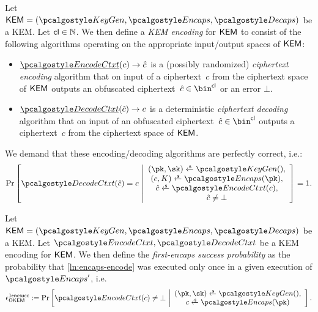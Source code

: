 \begin{definition}
\label{def:kem-encoding}
    Let $\KEM = (\kgen, \encaps, \decaps)$ be a KEM.
    Let $\mathsf{cl} \in \mathbb N$.
    We then define a \emph{KEM encoding} for $\mathsf{KEM}$ to consist of the following algorithms operating on the appropriate input/output spaces of $\mathsf{KEM}$:
    \begin{itemize}
        \item $\ul{\encodectxt}(c) \to \hat c$
        is a (possibly randomized) \emph{ciphertext encoding} algorithm that on input of a ciphertext~$c$ from the ciphertext space of $\mathsf{KEM}$ outputs an obfuscated ciphertext~$\hat c \in \bin^{\obfctxtlen}$ or an error $\bot$.
        \item $\ul{\decodectxt}(\hat c) \to c$
        is a deterministic \emph{ciphertext decoding} algorithm that on input of an obfuscated ciphertext~$\hat c \in \bin^{\obfctxtlen}$ outputs a ciphertext~$c$ from the ciphertext space of $\mathsf{KEM}$.
    \end{itemize}

    We demand that these encoding/decoding algorithms are perfectly correct, i.e.:
    \[
        \Pr\left[
            \decodectxt(\hat c) = c
        ~\middle|
            \begin{array}{c}
                (\pk, \sk) \getsr \kgen(),\\
                (c, K) \getsr \encaps(\pk),\\
                \hat c \getsr \encodectxt(c),\\
                \hat c \neq \bot
            \end{array}
        \right] = 1.
    \]
\end{definition}

\begin{definition}
\label{def:first-encaps-success}
    Let $\KEM = (\kgen, \encaps, \decaps)$ be a KEM.
    Let $\encodectxt, \decodectxt$ be a KEM encoding for $\mathsf{KEM}$.
    We then define the \emph{first-encaps success probability} as the probability that \cref{ln:encaps-encode} was executed only once in a given execution of $\encaps'$, i.e.
    \[
        \epsilon^\firstencapssuccess_\OKEM :=
        \Pr\left[
            \encodectxt(c) \neq \bot
        ~\middle|
            \begin{array}{c}
                (\pk, \sk) \getsr \kgen(), \\
                c \getsr \encaps(\pk)
            \end{array}
        \right].
    \]
\end{definition}

